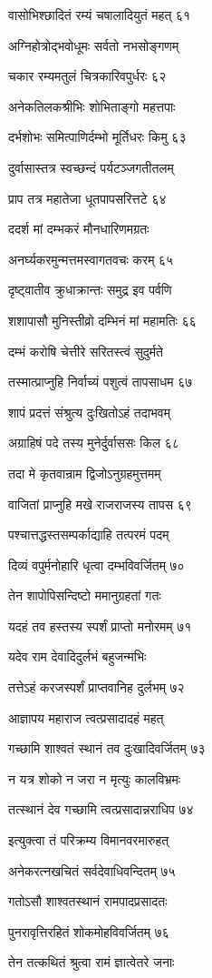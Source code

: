 वासोभिश्छादितं रम्यं चषालादियुतं महत् ६१

अग्निहोत्रोद्भवोधूमः सर्वतो नभसोङ्गणम्

चकार रम्यमतुलं चित्रकारिवपुर्धरः ६२

अनेकतिलकश्रीभिः शोभिताङ्गो महत्तपाः

दर्भशोभः समित्पाणिर्दम्भो मूर्तिधरः किमु ६३

दुर्वासास्तत्र स्वच्छन्दं पर्यटञ्जगतीतलम्

प्राप तत्र महातेजा धूतपापसरित्तटे ६४

ददर्श मां दम्भकरं मौनधारिणमग्रतः

अनर्घ्यकरमुन्मत्तमस्वागतवचः करम् ६५

दृष्ट्वातीव क्रुधाक्रान्तः समुद्र इव पर्वणि

शशापासौ मुनिस्तीव्रो दम्भिनं मां महामतिः ६६

दम्भं करोषि चेत्तीरे सरितस्त्वं सुदुर्मते

तस्मात्प्राप्नुहि निर्वाच्यं पशुत्वं तापसाधम ६७

शापं प्रदत्तं संश्रुत्य दुःखितोऽहं तदाभवम्

अग्राहिषं पदे तस्य मुनेर्दुर्वाससः किल ६८

तदा मे कृतवान्राम द्विजोऽनुग्रहमुत्तमम्

वाजितां प्राप्नुहि मखे राजराजस्य तापस ६९

पश्चात्तद्धस्तसम्पर्काद्याहि तत्परमं पदम्

दिव्यं वपुर्मनोहारि धृत्वा दम्भविवर्जितम् ७०

तेन शापोपिसन्दिष्टो ममानुग्रहतां गतः

यदहं तव हस्तस्य स्पर्शं प्राप्तो मनोरमम् ७१

यदेव राम देवादिदुर्लभं बहुजन्मभिः

तत्तेऽहं करजस्पर्शं प्राप्तवानिह दुर्लभम् ७२

आज्ञापय महाराज त्वत्प्रसादादहं महत्

गच्छामि शाश्वतं स्थानं तव दुःखादिवर्जितम् ७३

न यत्र शोको न जरा न मृत्युः कालविभ्रमः

तत्स्थानं देव गच्छामि त्वत्प्रसादान्नराधिप ७४

इत्युक्त्वा तं परिक्रम्य विमानवरमारुहत्

अनेकरत्नखचितं सर्वदेवाधिवन्दितम् ७५

गतोऽसौ शाश्वतस्थानं रामपादप्रसादतः

पुनरावृत्तिरहितं शोकमोहविवर्जितम् ७६

तेन तत्कथितं श्रुत्वा रामं ज्ञात्वेतरे जनाः

